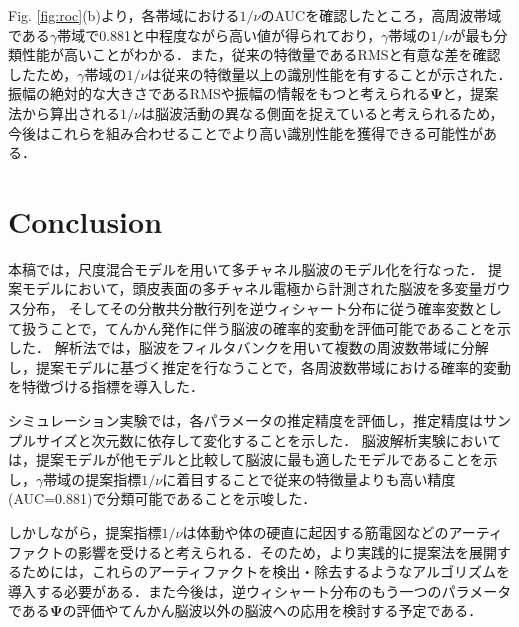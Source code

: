 \documentclass[journal]{IEEEtran}
\begin{document}
Fig. \ref{fig:roc}(b)より，各帯域における$1/\nu$のAUCを確認したところ，高周波帯域である$\gamma$帯域で0.881と中程度ながら高い値が得られており，$\gamma$帯域の$1/\nu$が最も分類性能が高いことがわかる．また，従来の特徴量であるRMSと有意な差を確認したため，$\gamma$帯域の$1/\nu$は従来の特徴量以上の識別性能を有することが示された．振幅の絶対的な大きさであるRMSや振幅の情報をもつと考えられる$\mathbf{\Psi}$と，提案法から算出される$1/\nu$は脳波活動の異なる側面を捉えていると考えられるため，今後はこれらを組み合わせることでより高い識別性能を獲得できる可能性がある．

\section{Conclusion}
本稿では，尺度混合モデルを用いて多チャネル脳波のモデル化を行なった．
提案モデルにおいて，頭皮表面の多チャネル電極から計測された脳波を多変量ガウス分布，
そしてその分散共分散行列を逆ウィシャート分布に従う確率変数として扱うことで，てんかん発作に伴う脳波の確率的変動を評価可能であることを示した．
解析法では，脳波をフィルタバンクを用いて複数の周波数帯域に分解し，提案モデルに基づく推定を行なうことで，各周波数帯域における確率的変動を特徴づける指標を導入した．

シミュレーション実験では，各パラメータの推定精度を評価し，推定精度はサンプルサイズと次元数に依存して変化することを示した．
脳波解析実験においては，提案モデルが他モデルと比較して脳波に最も適したモデルであることを示し，$\gamma$帯域の提案指標$1/\nu$に着目することで従来の特徴量よりも高い精度(AUC=0.881)で分類可能であることを示唆した．

しかしながら，提案指標$1/\nu$は体動や体の硬直に起因する筋電図などのアーティファクトの影響を受けると考えられる．そのため，より実践的に提案法を展開するためには，これらのアーティファクトを検出・除去するようなアルゴリズムを導入する必要がある．また今後は，逆ウィシャート分布のもう一つのパラメータである$\mathbf{\Psi}$の評価やてんかん脳波以外の脳波への応用を検討する予定である．
\end{document}
